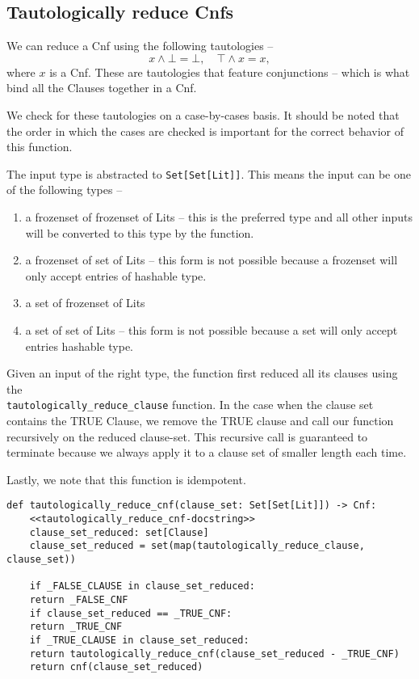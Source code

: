 \documentclass[11pt]{article}
\begin{document}
\subsection{Tautologically reduce Cnfs}
\label{sec:org373350b}
We can reduce a Cnf using the following tautologies -- \[x \wedge \bot =
\bot,\quad \top \wedge x = x,\] where \(x\) is a Cnf. These are tautologies
that feature conjunctions -- which is what bind all the Clauses together in
a Cnf.

We check for these tautologies on a case-by-cases basis. It should be noted
that the order in which the cases are checked is important for the correct
behavior of this function.

The input type is abstracted to \texttt{Set[Set[Lit]]}. This means the input can
be one of the following types --
\begin{enumerate}
\item a frozenset of frozenset of Lits -- this is the preferred type and all
other inputs will be converted to this type by the function.
\item a frozenset of set of Lits -- this form is not possible because a
frozenset will only accept entries of hashable type.
\item a set of frozenset of Lits
\item a set of set of Lits -- this form is not possible because a set will
only accept entries hashable type.
\end{enumerate}

Given an input of the right type, the function first reduced all its
clauses using the\\
\texttt{tautologically\_reduce\_clause} function. In the case when the clause set
contains the TRUE Clause, we remove the TRUE clause and call our function
recursively on the reduced clause-set. This recursive call is guaranteed to
terminate because we always apply it to a clause set of smaller length each
time.

Lastly, we note that this function is idempotent.

\begin{verbatim}
def tautologically_reduce_cnf(clause_set: Set[Set[Lit]]) -> Cnf:
    <<tautologically_reduce_cnf-docstring>>
    clause_set_reduced: set[Clause]
    clause_set_reduced = set(map(tautologically_reduce_clause, clause_set))

    if _FALSE_CLAUSE in clause_set_reduced:
	return _FALSE_CNF
    if clause_set_reduced == _TRUE_CNF:
	return _TRUE_CNF
    if _TRUE_CLAUSE in clause_set_reduced:
	return tautologically_reduce_cnf(clause_set_reduced - _TRUE_CNF)
    return cnf(clause_set_reduced)
\end{verbatim}
\end{document}
